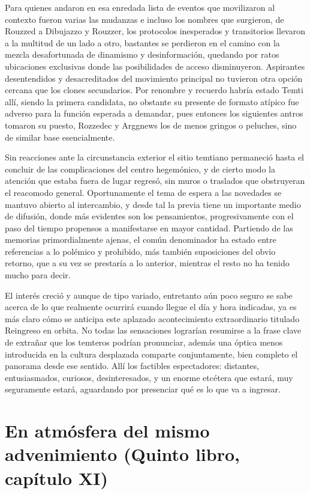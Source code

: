 \documentclass[
]{book}
\begin{document}
Para quienes andaron en esa enredada lista de eventos que movilizaron al contexto fueron varias las mudanzas e incluso los nombres que surgieron, de Rouzzed a Dibujazzo y Rouzzer, los protocolos inesperados y transitorios llevaron a la multitud de un lado a otro, bastantes se perdieron en el camino con la mezcla desafortunada de dinamismo y desinformación, quedando por ratos ubicaciones exclusivas donde las posibilidades de acceso disminuyeron. Aspirantes desentendidos y desacreditados del movimiento principal no tuvieron otra opción cercana que los clones secundarios. Por renombre y recuerdo habría estado Temti allí, siendo la primera candidata, no obstante su presente de formato atípico fue adverso para la función esperada a demandar, pues entonces los siguientes antros tomaron su puesto, Rozzedec y Arggnews los de menos gringos o peluches, sino de similar base esencialmente.

Sin reacciones ante la circunstancia exterior el sitio temtiano permaneció hasta el concluir de las complicaciones del centro hegemónico, y de cierto modo la atención que estaba fuera de lugar regresó, sin muros o traslados que obstruyeran el reacomodo general. Oportunamente el tema de espera a las novedades se mantuvo abierto al intercambio, y desde tal la previa tiene un importante medio de difusión, donde más evidentes son los pensamientos, progresivamente con el paso del tiempo propensos a manifestarse en mayor cantidad. Partiendo de las memorias primordialmente ajenas, el común denominador ha estado entre referencias a lo polémico y prohibido, más también suposiciones del obvio retorno, que a su vez se prestaría a lo anterior, mientras el resto no ha tenido mucho para decir.

El interés creció y aunque de tipo variado, entretanto aún poco seguro se sabe acerca de lo que realmente ocurrirá cuando llegue el día y hora indicadas, ya es más claro cómo se anticipa este aplazado acontecimiento extraordinario titulado Reingreso en orbita. No todas las sensaciones lograrían resumirse a la frase clave de extrañar que los temteros podrían pronunciar, además una óptica menos introducida en la cultura desplazada comparte conjuntamente, bien completo el panorama desde ese sentido. Allí los factibles espectadores: distantes, entusiasmados, curiosos, desinteresados, y un enorme etcétera que estará, muy seguramente estará, aguardando por presenciar qué es lo que va a ingresar.

\hypertarget{en-atmuxf3sfera-del-mismo-advenimiento-quinto-libro-capuxedtulo-xi}{%
\section{En atmósfera del mismo advenimiento (Quinto libro, capítulo XI)}\label{en-atmuxf3sfera-del-mismo-advenimiento-quinto-libro-capuxedtulo-xi}}
\end{document}
